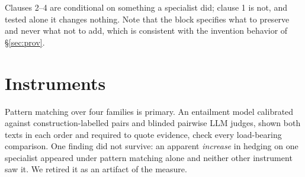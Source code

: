 \documentclass[11pt]{article}
\begin{document}
Clauses 2--4 are conditional on something a specialist did; clause 1 is not,
and tested alone it changes nothing. Note that the block specifies what to
preserve and never what not to add, which is consistent with the invention
behavior of \S\ref{sec:prov}.

\section{Instruments}
\label{app:instr}
Pattern matching over four families is primary. An entailment model calibrated
against construction-labelled pairs and blinded pairwise LLM judges, shown both
texts in each order and required to quote evidence, check every load-bearing
comparison. One finding did not survive: an apparent \emph{increase} in
hedging on one specialist appeared under pattern matching alone and neither
other instrument saw it. We retired it as an artifact of the measure.
\end{document}

